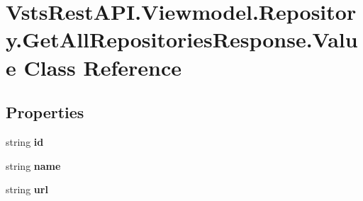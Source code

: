 \hypertarget{class_vsts_rest_a_p_i_1_1_viewmodel_1_1_repository_1_1_get_all_repositories_response_1_1_value}{}\section{Vsts\+Rest\+A\+P\+I.\+Viewmodel.\+Repository.\+Get\+All\+Repositories\+Response.\+Value Class Reference}
\label{class_vsts_rest_a_p_i_1_1_viewmodel_1_1_repository_1_1_get_all_repositories_response_1_1_value}
\subsection*{Properties}
\begin{DoxyCompactItemize}
\item 
\mbox{\label{class_vsts_rest_a_p_i_1_1_viewmodel_1_1_repository_1_1_get_all_repositories_response_1_1_value_abd02bd4021b28e40f8d4e18bee6731da}} 
string {\bfseries id}
\item 
\mbox{\label{class_vsts_rest_a_p_i_1_1_viewmodel_1_1_repository_1_1_get_all_repositories_response_1_1_value_a4e3bc3d3e3870795b801557ad750acc7}} 
string {\bfseries name}
\item 
\mbox{\label{class_vsts_rest_a_p_i_1_1_viewmodel_1_1_repository_1_1_get_all_repositories_response_1_1_value_a45dd67413433e60c2762ac54a928ae4b}} 
string {\bfseries url}
\item 
\mbox{\label{class_vsts_rest_a_p_i_1_1_viewmodel_1_1_repository_1_1_get_all_repositories_response_1_1_value_a73f0fd683d617bd50902293f26269011}} 

\end{DoxyCompactItemize}

